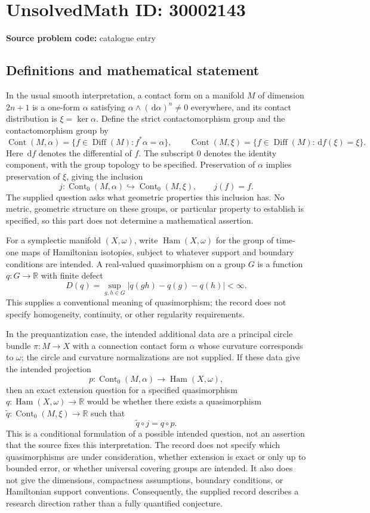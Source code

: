 \documentclass[11pt]{article}
\newcommand{\R}{\mathbb{R}}
\newcommand{\dd}{\,\mathrm{d}}
\begin{document}
\section*{UnsolvedMath ID: 30002143}
\textbf{Source problem code:} catalogue entry
\subsection{Definitions and mathematical statement}
In the usual smooth interpretation, a contact form on a manifold \(M\) of dimension \(2n+1\) is a one-form \(\alpha\) satisfying \(\alpha\wedge(\dd\alpha)^n\neq 0\) everywhere, and its contact distribution is \(\xi=\ker\alpha\). Define the strict contactomorphism group and the contactomorphism group by
\[
\operatorname{Cont}(M,\alpha)=\{f\in\operatorname{Diff}(M):f^*\alpha=\alpha\},\qquad
\operatorname{Cont}(M,\xi)=\{f\in\operatorname{Diff}(M):\dd f(\xi)=\xi\}.
\]
Here \(\dd f\) denotes the differential of \(f\). The subscript \(0\) denotes the identity component, with the group topology to be specified. Preservation of \(\alpha\) implies preservation of \(\xi\), giving the inclusion
\[
j:\operatorname{Cont}_0(M,\alpha)\hookrightarrow\operatorname{Cont}_0(M,\xi),\qquad j(f)=f.
\]
The supplied question asks what geometric properties this inclusion has. No metric, geometric structure on these groups, or particular property to establish is specified, so this part does not determine a mathematical assertion.

For a symplectic manifold \((X,\omega)\), write \(\operatorname{Ham}(X,\omega)\) for the group of time-one maps of Hamiltonian isotopies, subject to whatever support and boundary conditions are intended. A real-valued quasimorphism on a group \(G\) is a function \(q:G\to\R\) with finite defect
\[
D(q)=\sup_{g,h\in G}|q(gh)-q(g)-q(h)|<\infty.
\]
This supplies a conventional meaning of quasimorphism; the record does not specify homogeneity, continuity, or other regularity requirements.

In the prequantization case, the intended additional data are a principal circle bundle \(\pi:M\to X\) with a connection contact form \(\alpha\) whose curvature corresponds to \(\omega\); the circle and curvature normalizations are not supplied. If these data give the intended projection
\[
p:\operatorname{Cont}_0(M,\alpha)\longrightarrow\operatorname{Ham}(X,\omega),
\]
then an exact extension question for a specified quasimorphism \(q:\operatorname{Ham}(X,\omega)\to\R\) would be whether there exists a quasimorphism \(\widetilde q:\operatorname{Cont}_0(M,\xi)\to\R\) such that
\[
\widetilde q\circ j=q\circ p.
\]
This is a conditional formulation of a possible intended question, not an assertion that the source fixes this interpretation. The record does not specify which quasimorphisms are under consideration, whether extension is exact or only up to bounded error, or whether universal covering groups are intended. It also does not give the dimensions, compactness assumptions, boundary conditions, or Hamiltonian support conventions. Consequently, the supplied record describes a research direction rather than a fully quantified conjecture.
\end{document}
